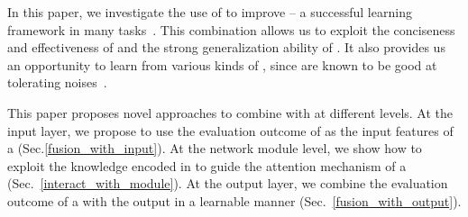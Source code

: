 
In this paper, we investigate the use of \REs to improve \NNs -- a successful learning framework in many \NLP
tasks~\cite{goldberg2017neural}.
This combination allows us to exploit the conciseness and effectiveness of \REs and the strong generalization ability of \NNs.
It also provides us an opportunity to learn from various kinds of  \REs,
since \NNs are known to be good at tolerating noises~\cite{xie2016disturblabel}.




This paper proposes novel approaches to combine \REs with \NNs at different levels.  At the input layer, we propose to use the evaluation
outcome of \REs as the input features of a \NN (Sec.\ref{fusion_with_input}).
At the network module level, we show how to
exploit the knowledge encoded in \REs to guide the attention mechanism of a \NN (Sec.~\ref{interact_with_module}). At the output layer, we
combine the evaluation outcome of a \RE with the \NN output in a learnable manner (Sec.~\ref{fusion_with_output}).


